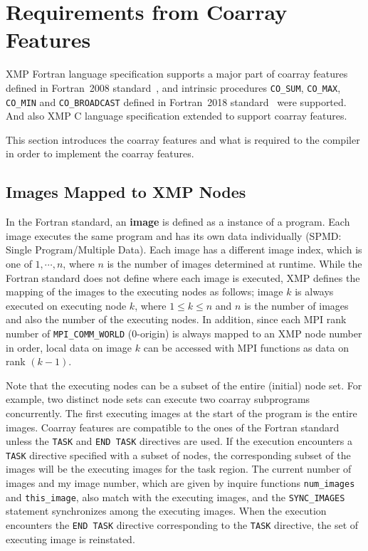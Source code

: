 \section{Requirements from Coarray Features}\label{sec:spec}

XMP Fortran language specification supports a major part of coarray features defined in 
Fortran~2008 standard~\cite{F08}, and intrinsic procedures 
{\tt CO\_SUM}, {\tt CO\_MAX}, {\tt CO\_MIN} and {\tt CO\_BROADCAST} defined in 
Fortran~2018 standard~\cite{F18} were supported.
And also XMP C language specification extended to support coarray features.

This section introduces the coarray features and what is required
to the compiler in order to implement the coarray features.


\subsection{Images Mapped to XMP Nodes}\label{sec:spec-image}

In the Fortran standard, an {\bf image} is defined as a instance of a program. 
Each image executes the same program and has its own data individually 
(SPMD: Single Program/Multiple Data).
Each image has a different image index, which is one of $1, \cdots, n$, 
where $n$ is the number of images determined at runtime. 
While the Fortran standard does not define where each image is executed, 
XMP defines the mapping of the images to the executing nodes as follows;
image $k$ is always executed on executing node $k$, 
where $1 \leq k \leq n$ and 
$n$ is the number of images and also the number of the executing nodes. 
In addition, since each MPI rank number of {\tt MPI\_COMM\_WORLD} (0-origin) is 
always mapped to an XMP node number in order, local data on image $k$ can be
accessed with MPI functions as data on rank $(k - 1)$.

Note that the executing nodes can be a subset of the entire (initial) node set. 
For example, two distinct node sets can execute two coarray subprograms concurrently.
The first executing images at the start of the program is the entire images.
Coarray features are compatible to the ones of the Fortran standard unless 
the {\tt TASK} and {\tt END TASK} directives are used.
If the execution encounters a {\tt TASK} directive specified with a subset of nodes, 
the corresponding subset of the images will be the executing images for the task region. 
The current number of images and my image number, which are given by inquire functions
{\tt num\_images} and {\tt this\_image}, also match with the executing images, and
the {\tt SYNC\_IMAGES} statement synchronizes among the executing images.
When the execution encounters the {\tt END TASK} directive corresponding to the
{\tt TASK} directive, the set of executing image is reinstated.

